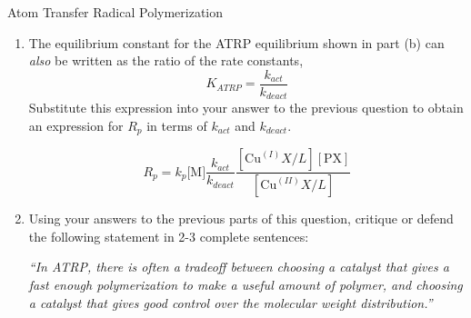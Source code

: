 \begin{activity}{Atom Transfer Radical Polymerization}
\begin{exercises}
\begin{enumerate}
				Use this information, and appropriate information from Activity 4.\ref{FRPkinetics}, to write an equation for the overall polymerization rate $R_p$ in terms of $K_{ATRP}$, $k_p$, and the concentrations of any relevant chemical species.
		
		\begin{solution}{}
			As shown in Activity 4.\ref{FRPkinetics}, $R_p$ is given by
			\begin{equation*}
				R_p = k_p\text{[M][\ce{P^.}]}
			\end{equation*}
			Rearranging the above expression for $K_{ATRP}$ to solve for $[\text{P}^\bullet]$, we obtain
			\begin{equation*}
				[\text{P}^\bullet] = K_{ATRP}\frac{[\text{Cu}^{(I)}X/L][\text{PX}]}{[\text{Cu}^{(II)}X/L]}
			\end{equation*}
			Combining these two equations, we obtain
			\begin{equation*}
				R_p = k_p\text{[M]}K_{ATRP}\frac{[\text{Cu}^{(I)}X/L][\text{PX}]}{[\text{Cu}^{(II)}X/L]}
			\end{equation*}
		\end{solution}
				
			\item The equilibrium constant for the ATRP equilibrium shown in part (b) can \emph{also} be written as the ratio of the rate constants,
				\begin{equation*}
					K_{ATRP} = \frac{k_{act}}{k_{deact}}
				\end{equation*}
				Substitute this expression into your answer to the previous question to obtain an expression for $R_p$ in terms of $k_{act}$ and $k_{deact}$.
		
		\begin{solution}{}
			\begin{equation*}
				R_p = k_p\text{[M]}\frac{k_{act}}{k_{deact}}\frac{[\text{Cu}^{(I)}X/L][\text{PX}]}{[\text{Cu}^{(II)}X/L]}
			\end{equation*}
		\end{solution}
				
			\item Using your answers to the previous parts of this question, critique or defend the following statement in 2-3 complete sentences:
			
				\emph{``In ATRP, there is often a tradeoff between choosing a catalyst that gives a fast enough polymerization to make a useful amount of polymer, and choosing a catalyst that gives good control over the molecular weight distribution.''}
		

\end{enumerate}
\end{exercises}
\end{activity}
